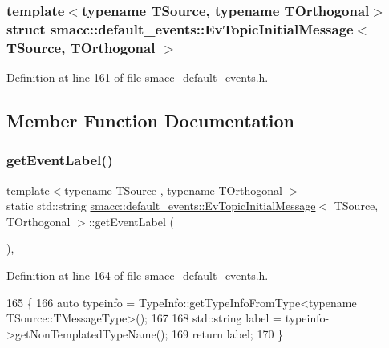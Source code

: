 \subsubsection*{template$<$typename T\+Source, typename T\+Orthogonal$>$\newline
struct smacc\+::default\+\_\+events\+::\+Ev\+Topic\+Initial\+Message$<$ T\+Source, T\+Orthogonal $>$}



Definition at line 161 of file smacc\+\_\+default\+\_\+events.\+h.



\subsection{Member Function Documentation}
\mbox{\label{structsmacc_1_1default__events_1_1EvTopicInitialMessage_a4ca5f8050156f87ffc6f6f02635635e2}} 
\subsubsection{\texorpdfstring{get\+Event\+Label()}{getEventLabel()}}
{\footnotesize\ttfamily template$<$typename T\+Source , typename T\+Orthogonal $>$ \\
static std\+::string \hyperlink{structsmacc_1_1default__events_1_1EvTopicInitialMessage}{smacc\+::default\+\_\+events\+::\+Ev\+Topic\+Initial\+Message}$<$ T\+Source, T\+Orthogonal $>$\+::get\+Event\+Label (\begin{DoxyParamCaption}{ }\end{DoxyParamCaption})\hspace{0.3cm}{\ttfamily [inline]}, {\ttfamily [static]}}



Definition at line 164 of file smacc\+\_\+default\+\_\+events.\+h.


\begin{DoxyCode}
165   \{
166     \textcolor{keyword}{auto} typeinfo = TypeInfo::getTypeInfoFromType<typename TSource::TMessageType>();
167 
168     std::string label = typeinfo->getNonTemplatedTypeName();
169     \textcolor{keywordflow}{return} label;
170   \}
\end{DoxyCode}


